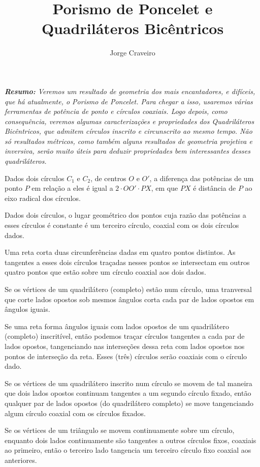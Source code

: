 \documentclass[10pt, a4paper]{article}
\title{Porismo de Poncelet e Quadriláteros Bicêntricos}
\author{Jorge Craveiro}
\begin{document}
	
	\zeustitle
	\begin{center}
		\begin{minipage}{0.9\textwidth}
			\itshape \textcolor{sec1}{\bfseries Resumo:} Veremos um resultado de geometria dos mais encantadores, e difíceis, que há atualmente, o Porismo de Poncelet. Para chegar a isso, usaremos várias ferramentas de potência de ponto e círculos coaxiais. Logo depois, como consequência, veremos algumas caracterizações e propriedades dos Quadriláteros Bicêntricos, que admitem círculos inscrito e circunscrito ao mesmo tempo. Não só resultados métricos, como também alguns resultados de geometria projetiva e inversiva, serão muito úteis para deduzir propriedades bem interessantes desses quadriláteros.
		\end{minipage}
	\end{center}
	\begin{prob}
		Dados dois círculos $C_1$ e $C_2$, de centros $O$ e $O'$, a diferença das potências de um ponto $P$ em relação a eles é igual a $2 \cdot OO' \cdot PX$, em que $PX$ é distância de $P$ ao eixo radical dos círculos.
	\end{prob}
	\begin{prob}
		Dados dois círculos, o lugar geométrico dos pontos cuja razão das potências a esses círculos é constante é um terceiro círculo, coaxial com os dois círculos dados.
	\end{prob}
	\begin{prob}
		Uma reta corta duas circunferências dadas em quatro pontos distintos. As tangentes a esses dois círculos traçadas nesses pontos se intersectam em outros quatro pontos que estão sobre um círculo coaxial aos dois dados.
	\end{prob}
	\begin{prob}
		Se os vértices de um quadrilátero (completo) estão num círculo, uma tranversal que corte lados opostos sob mesmos ângulos corta cada par de lados opostos em ângulos iguais.
	\end{prob}
	\begin{prob}
		Se uma reta forma ângulos iguais com lados opostos de um quadrilátero (completo) inscritível, então podemos traçar círculos tangentes a cada par de lados opostos, tangenciando nas interseções dessa reta com lados opostos nos pontos de interseção da reta. Esses (três) círculos serão coaxiais com o círculo dado.
	\end{prob}
	\begin{prob}
		Se os vértices de um quadrilátero inscrito num círculo se movem de tal maneira que dois lados opostos continuam tangentes a um segundo círculo fixado, então qualquer par de lados opostos (do quadrilátero completo) se move tangenciando algum círculo coaxial com os círculos fixados.
	\end{prob}
	\begin{prob}
		Se os vértices de um triângulo se movem continuamente sobre um círculo, enquanto dois lados continuamente são tangentes a outros círculos fixos, coaxiais ao primeiro, então o terceiro lado tangencia um terceiro círculo fixo coaxial aos anteriores.
	\end{prob}
\end{document}
